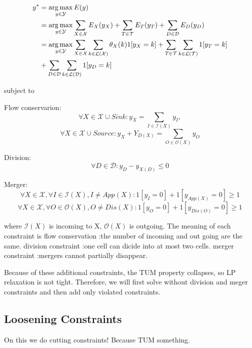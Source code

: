 \documentclass[10pt,twocolumn,letterpaper]{article}
\begin{document}
\begin{scriptsize}
\begin{equation*}
\begin{split}
 y^* &= \operatorname*{arg\,max}_{y\in\mathcal{Y}} E(y) \\ 
     &= \operatorname*{arg\,max}_{y\in\mathcal{Y}} \sum\limits_{X\in\mathcal{X}} E_X(y_X) + \sum\limits_{T\in\mathcal{T}} E_T(y_T) + \sum\limits_{D\in\mathcal{D}} E_D(y_D) \\
     &= \operatorname*{arg\,max}_{y\in\mathcal{Y}} \sum\limits_{X\in\mathcal{X}} \sum\limits_{k\in\mathcal{L(X)}} \theta_X(k) 1[y_X = k] + \sum\limits_{T\in\mathcal{T}} \sum\limits_{k\in\mathcal{L(T)}} 1[y_T = k] \newline \\
     & + \sum\limits_{D\in\mathcal{D}} \sum\limits_{k\in\mathcal{L(D)}} 1[y_D = k] 
\end{split}
\end{equation*}

subject to

Flow conservarion:
\[
\forall X\in\mathcal{X} \cup Sink : y_{X} = \sum\limits_{I\in\mathcal{I}(X)}y_{I}, 
\]
\[
\forall X\in\mathcal{X} \cup Source : y_{X} + Y_{D(X)} = \sum\limits_{O\in\mathcal{O}(X)}y_{O}
\]

Division:
\[
\forall D\in\mathcal{D} : y_{D} - y_{X(D)} \leq 0
\]

Merger:
\[
\forall X\in\mathcal{X}, \forall I\in\mathcal{I}(X),I \neq App(X) : 1[y_{I}=0]+1[y_{App(X)}=0] \geq 1
\]
\[
\forall X\in\mathcal{X}, \forall O\in\mathcal{O}(X),O \neq Dis(X) : 1[y_{O}=0]+1[y_{Dis(O)}=0] \geq 1
\]
\end{scriptsize}

where $\mathcal{I}(X)$ is incoming to X, $\mathcal{O}(X)$ is outgoing. The meaning of each constraint is
flow conservation :the number of incoming and out going are the same.
division constraint :one cell can dicide into at most two cells.
merger constraint :mergers cannot partially disappear.

Because of these additional constraints, the TUM property collapses, so LP relaxation is not tight.
Therefore, we will first solve without division and meger constraints and then add only violated constraints.
\subsection{Loosening Constraints}

On this we do cutting constraints! Because TUM something.
\end{document}
